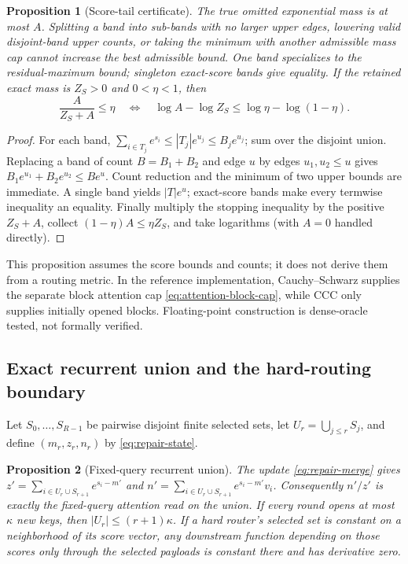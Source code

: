 \documentclass[11pt]{article}
\numberwithin{equation}{section}
\newtheorem{proposition}{Proposition}
\begin{document}
\begin{proposition}[Score-tail certificate]\label{prop:app-score-tail}
The true omitted exponential mass is at most $A$. Splitting a band into sub-bands with no larger upper edges,
lowering valid disjoint-band upper counts, or taking the minimum with another admissible mass cap cannot
increase the best admissible bound. One band specializes to the residual-maximum bound; singleton exact-score
bands give equality. If the retained exact mass is $Z_S>0$ and $0<\eta<1$, then
\begin{equation}\label{eq:app-score-tail-margin}
\frac{A}{Z_S+A}\le\eta
\quad\Longleftrightarrow\quad
\log A-\log Z_S\le\log\eta-\log(1-\eta).
\end{equation}
\end{proposition}
\begin{proof}
For each band,
$\sum_{i\in T_j}e^{s_i}\le |T_j|e^{u_j}\le B_je^{u_j}$; sum over the disjoint union. Replacing a band of
count $B=B_1+B_2$ and edge $u$ by edges $u_1,u_2\le u$ gives
$B_1e^{u_1}+B_2e^{u_2}\le Be^u$. Count reduction and the minimum of two upper bounds are immediate. A
single band yields $|T|e^u$; exact-score bands make every termwise inequality an equality. Finally multiply
the stopping inequality by the positive $Z_S+A$, collect $(1-\eta)A\le\eta Z_S$, and take logarithms (with
$A=0$ handled directly).
\end{proof}

This proposition assumes the score bounds and counts; it does not derive them from a routing metric. In the
reference implementation, Cauchy--Schwarz supplies the separate block attention cap
\eqref{eq:attention-block-cap}, while CCC only supplies initially opened blocks. Floating-point construction
is dense-oracle tested, not formally verified.

\subsection{Exact recurrent union and the hard-routing boundary}

Let $S_0,\ldots,S_{R-1}$ be pairwise disjoint finite selected sets, let
$U_r=\bigcup_{j\le r}S_j$, and define $(m_r,z_r,n_r)$ by \eqref{eq:repair-state}.

\begin{proposition}[Fixed-query recurrent union]\label{prop:app-repair-union}
The update \eqref{eq:repair-merge} gives
$z'=\sum_{i\in U_r\cup S_{r+1}}e^{s_i-m'}$ and
$n'=\sum_{i\in U_r\cup S_{r+1}}e^{s_i-m'}v_i$. Consequently $n'/z'$ is exactly the fixed-query
attention read on the union. If every round opens at most $\kappa$ new keys, then
$|U_r|\le(r+1)\kappa$. If a hard router's selected set is constant on a neighborhood of its score vector,
any downstream function depending on those scores only through the selected payloads is constant there and
has derivative zero.
\end{proposition}
\end{document}

